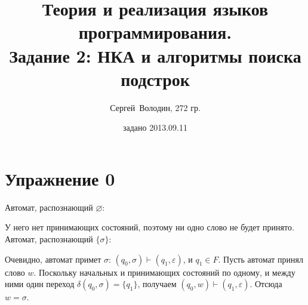 \documentclass[a4paper]{article}
\title{Теория и реализация языков программирования.\\Задание 2: НКА и алгоритмы поиска подстрок}
\date{задано 2013.09.11}
\author{Сергей~Володин, 272 гр.}
\begin{document}
\maketitle
\section*{Упражнение 0}
Автомат, распознающий $\varnothing$:
\begin{center}
\end{center}
У него нет принимающих состояний, поэтому ни одно слово не будет принято.
\\[10pt]
Автомат, распознающий $\{\sigma\}$:
\begin{center}
\end{center}
Очевидно, автомат примет $\sigma$: $(q_0,\sigma)\vdash(q_1,\varepsilon)$, и $q_1\in F$. Пусть автомат принял слово $w$. Поскольку начальных и принимающих состояний по одному, и между ними один переход $\delta(q_0,\sigma)=\{q_1\}$, получаем $(q_0,w)\vdash(q_1,\varepsilon)$. Отсюда $w=\sigma$.
\end{document}
